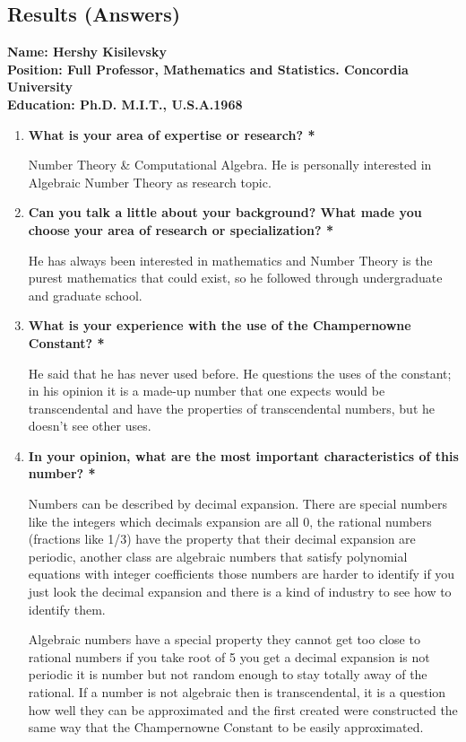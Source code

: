 \documentclass{report}
\begin{document}
\subsection{Results (Answers)} %

\textbf{Name: Hershy Kisilevsky} \\
\textbf{Position: Full Professor, Mathematics and Statistics. Concordia University} \\
\textbf{Education: Ph.D. M.I.T., U.S.A.1968} 
\newline
\begin{enumerate}
\item\textbf{What is your area of expertise or research?\color{red} *}

Number Theory \& Computational Algebra. He is personally interested in Algebraic Number Theory as research topic.

\item\textbf{Can you talk a little about your background? What made you choose your area of research or specialization?\color{red} *}

He has always been interested in mathematics and Number Theory is the purest mathematics that could exist, so he followed through undergraduate and graduate school.

\item\textbf{What is your experience with the use of the Champernowne Constant? \color{red} *}

He said that he has never used before. He questions the uses of the constant; in his opinion it is a made-up number that one expects would be transcendental and have the properties of transcendental numbers, but he doesn’t see other uses. 

\item\textbf{In your opinion, what are the most important characteristics of this number? \color{red} *}

Numbers can be described by decimal expansion. There are special numbers like the integers which decimals expansion are all 0, the rational numbers (fractions like 1/3) have the property that their decimal expansion are periodic, another class are algebraic numbers that satisfy polynomial equations with integer coefficients those numbers are harder to identify if you just look the decimal expansion and there is a kind of industry to see how to identify them. 

Algebraic numbers have a special property they cannot get too close to rational numbers if you take root of 5 you get a decimal expansion is not periodic it is number but not random enough to stay totally away of the rational. If a number is not algebraic then is transcendental, it is a question how well they can be approximated and the first created were constructed the same way that the Champernowne Constant to be easily approximated.


\end{enumerate}
\end{document}

